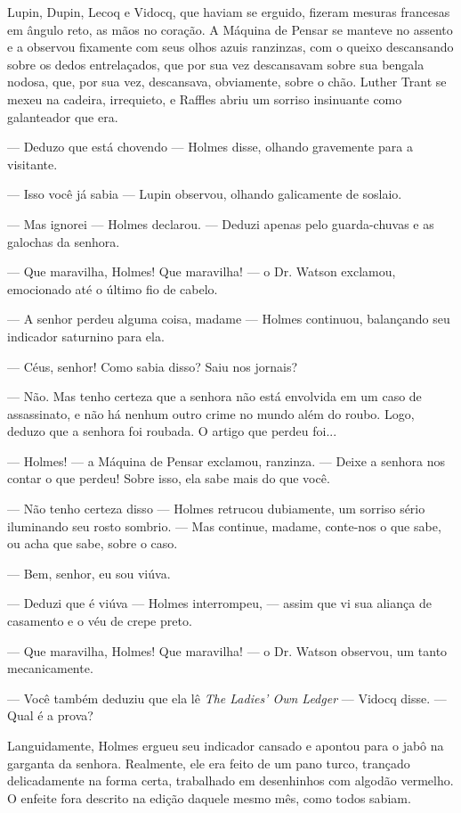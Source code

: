 Lupin, Dupin, Lecoq e Vidocq, que haviam se erguido, fizeram mesuras
francesas em ângulo reto, as mãos no coração. A Máquina de Pensar se
manteve no assento e a observou fixamente com seus olhos azuis
ranzinzas, com o queixo descansando sobre os dedos entrelaçados, que por
sua vez descansavam sobre sua bengala nodosa, que, por sua vez,
descansava, obviamente, sobre o chão. Luther Trant se mexeu na cadeira,
irrequieto, e Raffles abriu um sorriso insinuante como galanteador que
era.

--- Deduzo que está chovendo --- Holmes disse, olhando gravemente para a
visitante.

--- Isso você já sabia --- Lupin observou, olhando galicamente de
soslaio.

--- Mas ignorei --- Holmes declarou. --- Deduzi apenas pelo
guarda-chuvas e as galochas da senhora.

--- Que maravilha, Holmes! Que maravilha! --- o Dr. Watson exclamou,
emocionado até o último fio de cabelo.

--- A senhor perdeu alguma coisa, madame --- Holmes continuou,
balançando seu indicador saturnino para ela.

--- Céus, senhor! Como sabia disso? Saiu nos jornais?

--- Não. Mas tenho certeza que a senhora não está envolvida em um caso
de assassinato, e não há nenhum outro crime no mundo além do roubo.
Logo, deduzo que a senhora foi roubada. O artigo que perdeu foi...

--- Holmes! --- a Máquina de Pensar exclamou, ranzinza. --- Deixe a
senhora nos contar o que perdeu! Sobre isso, ela sabe mais do que você.

--- Não tenho certeza disso --- Holmes retrucou dubiamente, um sorriso
sério iluminando seu rosto sombrio. --- Mas continue, madame, conte-nos
o que sabe, ou acha que sabe, sobre o caso.

--- Bem, senhor, eu sou viúva.

--- Deduzi que é viúva --- Holmes interrompeu, --- assim que vi sua
aliança de casamento e o véu de crepe preto.

--- Que maravilha, Holmes! Que maravilha! --- o Dr. Watson observou, um
tanto mecanicamente.

--- Você também deduziu que ela lê \emph{The Ladies' Own Ledger} ---
Vidocq disse. --- Qual é a prova?

Languidamente, Holmes ergueu seu indicador cansado e apontou para o jabô
na garganta da senhora. Realmente, ele era feito de um pano turco,
trançado delicadamente na forma certa, trabalhado em desenhinhos com
algodão vermelho. O enfeite fora descrito na edição daquele mesmo mês,
como todos sabiam.

